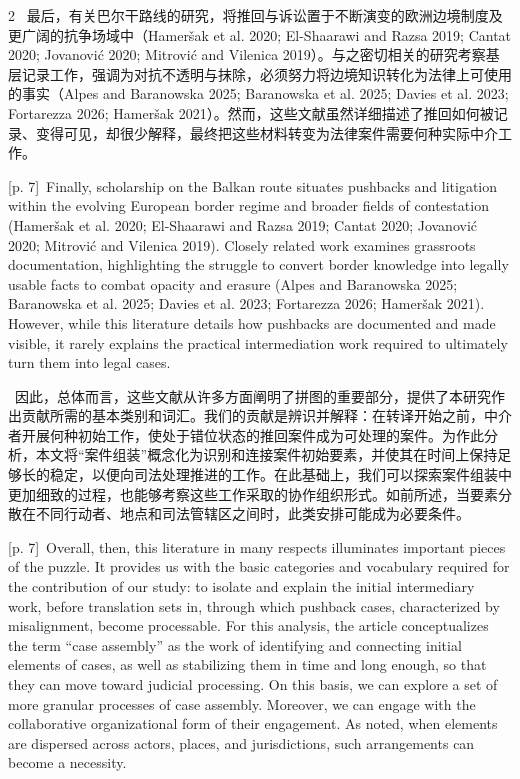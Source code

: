 \documentclass[10pt,a4paper]{article}
\begin{document}
\begin{paracol}{2}
\switchcolumn*
{\scriptsize\color{gray} [p. 7]}\ 最后，有关巴尔干路线的研究，将推回与诉讼置于不断演变的欧洲边境制度及更广阔的抗争场域中（Hameršak et al. 2020; El-Shaarawi and Razsa 2019; Cantat 2020; Jovanović 2020; Mitrović and Vilenica 2019）。与之密切相关的研究考察基层记录工作，强调为对抗不透明与抹除，必须努力将边境知识转化为法律上可使用的事实（Alpes and Baranowska 2025; Baranowska et al. 2025; Davies et al. 2023; Fortarezza 2026; Hameršak 2021）。然而，这些文献虽然详细描述了推回如何被记录、变得可见，却很少解释，最终把这些材料转变为法律案件需要何种实际中介工作。\par
\switchcolumn
{\scriptsize\color{gray} [p. 7]}\ Finally, scholarship on the Balkan route situates pushbacks and litigation within the evolving European border regime and broader fields of contestation (Hameršak et al. 2020; El-Shaarawi and Razsa 2019; Cantat 2020; Jovanović 2020; Mitrović and Vilenica 2019). Closely related work examines grassroots documentation, highlighting the struggle to convert border knowledge into legally usable facts to combat opacity and erasure (Alpes and Baranowska 2025; Baranowska et al. 2025; Davies et al. 2023; Fortarezza 2026; Hameršak 2021). However, while this literature details how pushbacks are documented and made visible, it rarely explains the practical intermediation work required to ultimately turn them into legal cases.\par
\switchcolumn*
{\scriptsize\color{gray} [p. 7]}\ 因此，总体而言，这些文献从许多方面阐明了拼图的重要部分，提供了本研究作出贡献所需的基本类别和词汇。我们的贡献是辨识并解释：在转译开始之前，中介者开展何种初始工作，使处于错位状态的推回案件成为可处理的案件。为作此分析，本文将“案件组装”概念化为识别和连接案件初始要素，并使其在时间上保持足够长的稳定，以便向司法处理推进的工作。在此基础上，我们可以探索案件组装中更加细致的过程，也能够考察这些工作采取的协作组织形式。如前所述，当要素分散在不同行动者、地点和司法管辖区之间时，此类安排可能成为必要条件。\par
\switchcolumn
{\scriptsize\color{gray} [p. 7]}\ Overall, then, this literature in many respects illuminates important pieces of the puzzle. It provides us with the basic categories and vocabulary required for the contribution of our study: to isolate and explain the initial intermediary work, before translation sets in, through which pushback cases, characterized by misalignment, become processable. For this analysis, the article conceptualizes the term “case assembly” as the work of identifying and connecting initial elements of cases, as well as stabilizing them in time and long enough, so that they can move toward judicial processing. On this basis, we can explore a set of more granular processes of case assembly. Moreover, we can engage with the collaborative organizational form of their engagement. As noted, when elements are dispersed across actors, places, and jurisdictions, such arrangements can become a necessity.\par
\switchcolumn*
\end{paracol}
\end{document}

